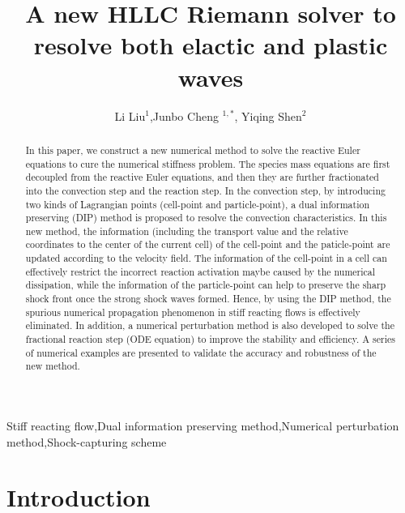 \documentclass{article}
\theoremstyle{plain}\newtheorem{definition}{\sc{Definition}}
\theoremstyle{defination}\newtheorem{example}{Example}[section]
\numberwithin{equation}{section}
\numberwithin{table}{section}
\begin{document}
\title{A new HLLC Riemann solver to resolve both elactic and plastic waves}
\author{Li Liu$^1$,Junbo Cheng $^{1,*}$, Yiqing Shen$^2$}
\address{$^1$LHD, Institute of Mechanics, Chinese Academy of Sciences, Beijing 100190, China}
\address{$^2$School of Engineering Science, University of Chinese Academy of Sciences, Beijing 100049, China}
{
\begin{abstract}
In this paper, we construct a new numerical method to solve the reactive Euler equations to cure the numerical stiffness problem.
The species mass equations are first decoupled from the reactive Euler equations, and then they are further fractionated into the convection step and the reaction step.
 In the convection
step, by introducing two kinds of Lagrangian points (cell-point and particle-point), a dual information preserving (DIP) method is proposed to resolve the convection characteristics. In this new method, the 
 information (including the transport value and the relative coordinates to the center of the current cell) of the cell-point and the paticle-point are updated according to the velocity field. The information of the cell-point in a cell can effectively restrict the incorrect reaction activation maybe caused by the numerical dissipation, while the information of the particle-point can help to preserve the sharp shock front once the strong shock waves formed. Hence, by using the DIP method, the spurious numerical propagation phenomenon in stiff reacting flows is effectively eliminated. In addition, a numerical perturbation method is also developed to solve the fractional reaction step (ODE equation) to improve the stability and efficiency. A series of numerical examples are presented to validate the accuracy and robustness of the new method. 
\end{abstract}
\begin{keyword}
 Stiff reacting flow\sep  Dual information preserving method\sep Numerical perturbation method\sep Shock-capturing scheme 
\end{keyword}

\maketitle
\section{Introduction}

}
\end{document}
